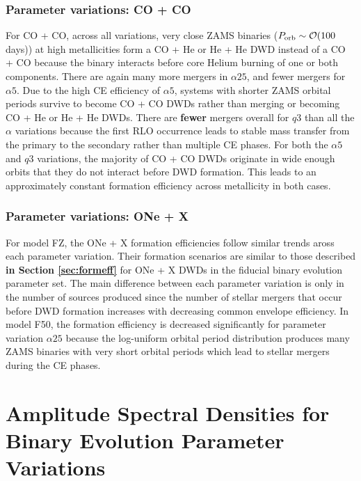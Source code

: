 \documentclass[twocolumn, linenumbers]{aastex631}
\begin{document}
\subsubsection{\textbf{Parameter variations: CO + 
CO}}\label{formeff_CO_vars}
For CO + CO, across all variations, very close ZAMS binaries 
($P_{\rm{orb}}\sim\mathcal{O}(100$ days)) at high metallicities form a CO 
+ He or He + He DWD instead of a CO + CO because the binary interacts 
before core Helium burning of one or both components. There are again many 
more mergers in $\alpha25$, and fewer mergers for $\alpha5$. Due to the 
high CE efficiency of $\alpha5$, systems with shorter ZAMS orbital periods 
survive to become CO + CO DWDs rather than merging or becoming CO + He or 
He + He DWDs. There are \textbf{fewer} mergers overall for $q3$ than all 
the $\alpha$ variations because the first RLO occurrence leads to stable 
mass transfer from the primary to the secondary rather than multiple CE 
phases. For both the $\alpha5$ and $q3$ variations, the majority of CO + 
CO DWDs originate in wide enough orbits that they do not interact before 
DWD formation. This leads to an approximately constant formation 
efficiency across metallicity in both cases.

\subsubsection{\textbf{Parameter variations: ONe + 
X}}\label{formeff_ONe_vars}
For model FZ, the ONe + X formation efficiencies follow similar trends 
aross each parameter variation. Their formation scenarios are similar to 
those described \textbf{in Section \ref{sec:formeff}} for ONe + X DWDs in 
the fiducial binary evolution parameter set. The main difference between 
each parameter variation is only in the number of sources produced since 
the number of stellar mergers that occur before DWD formation increases 
with decreasing common envelope efficiency. In model F50, the formation 
efficiency is decreased significantly for parameter variation $\alpha25$ 
because the log-uniform orbital period distribution produces many ZAMS 
binaries with very short orbital periods which lead to stellar mergers 
during the CE phases.


\section{Amplitude Spectral Densities for Binary Evolution Parameter 
Variations}\label{appendix:ASD_vars}
\end{document}
